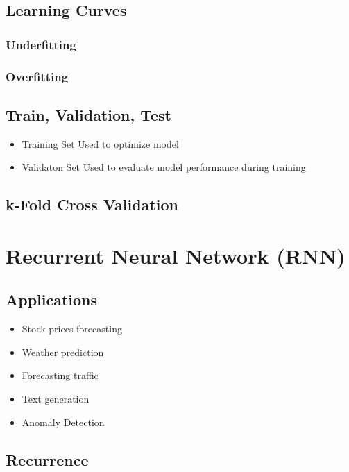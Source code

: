 \documentclass[a4paper, landscape, 10pt]{scrartcl}
\begin{document}
\begin{multicols*}{3}
        \subsection{Learning Curves}
        \subsubsection{Underfitting}
        \subsubsection{Overfitting}

        \subsection{Train, Validation, Test}
        \begin{itemize}
            \item Training Set
            \subitem Used to optimize model
            \item Validaton Set
            \subitem Used to evaluate model performance during training
            \subitem
        \end{itemize}

        \subsection{k-Fold Cross Validation}


        \section{Recurrent Neural Network (RNN)}
        \subsection{Applications}
        \begin{itemize}
            \item Stock prices forecasting
            \item Weather prediction
            \item Forecasting traffic
            \item Text generation
            \item Anomaly Detection
        \end{itemize}

        \subsection{Recurrence}
        

\end{multicols*}
\end{document}
